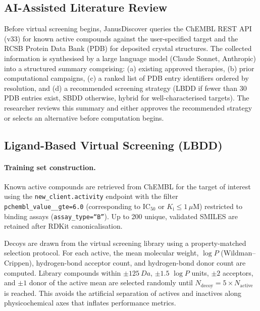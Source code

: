 \documentclass[journal=jcisd8,manuscript=article]{achemso}
\begin{document}
\subsection{AI-Assisted Literature Review}

Before virtual screening begins, JanusDiscover queries the ChEMBL REST API
(v33)\cite{gaulton2012chembl} for known active compounds against the
user-specified target and the RCSB Protein Data Bank
(PDB)\cite{berman2000protein} for deposited crystal structures.  The
collected information is synthesised by a large language model (Claude
Sonnet, Anthropic) into a structured summary comprising: (a) existing
approved therapies, (b) prior computational campaigns, (c) a ranked list
of PDB entry identifiers ordered by resolution, and (d) a recommended
screening strategy (LBDD if fewer than 30 PDB entries exist, SBDD
otherwise, hybrid for well-characterised targets).  The researcher reviews
this summary and either approves the recommended strategy or selects an
alternative before computation begins.

\subsection{Ligand-Based Virtual Screening (LBDD)}

\paragraph{Training set construction.}
Known active compounds are retrieved from ChEMBL for the target of interest
using the \texttt{new\_client.activity} endpoint with the filter
\texttt{pchembl\_value\_\_gte=6.0} (corresponding to IC$_{50}$ or $K_\mathrm{i}
\leq 1\,\mu$M) restricted to binding assays
(\texttt{assay\_type=``B''}).  Up to 200 unique, validated SMILES are
retained after RDKit canonicalisation.\cite{rdkit}

Decoys are drawn from the virtual screening library using a
property-matched selection protocol.  For each active, the mean molecular
weight, $\log P$ (Wildman--Crippen), hydrogen-bond acceptor count, and
hydrogen-bond donor count are computed.  Library compounds within $\pm
\SI{125}{Da}$, $\pm 1.5$ $\log P$ units, $\pm 2$ acceptors, and $\pm 1$
donor of the active mean are selected randomly until
$N_{\mathrm{decoy}} = 5 \times N_{\mathrm{active}}$ is reached.  This
avoids the artificial separation of actives and inactives along
physicochemical axes that inflates performance
metrics.\cite{mysinger2012dud}
\end{document}
